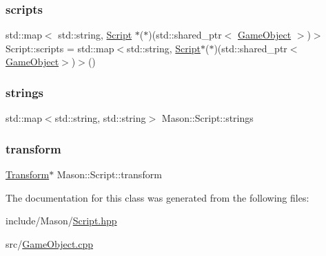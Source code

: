 \subsubsection{\texorpdfstring{scripts}{scripts}}
{\footnotesize\ttfamily std\+::map$<$ std\+::string, \hyperlink{class_mason_1_1_script}{Script} $\ast$($\ast$)(std\+::shared\+\_\+ptr$<$ \hyperlink{class_mason_1_1_game_object}{Game\+Object} $>$)$>$ Script\+::scripts = std\+::map$<$std\+::string, \hyperlink{class_mason_1_1_script}{Script}$\ast$($\ast$)(std\+::shared\+\_\+ptr$<$\hyperlink{class_mason_1_1_game_object}{Game\+Object}$>$)$>$()\hspace{0.3cm}{\ttfamily [static]}}

\hypertarget{class_mason_1_1_script_a96f691d0ccd8db2e3e95824e8579cc42}{}\label{class_mason_1_1_script_a96f691d0ccd8db2e3e95824e8579cc42} 
\subsubsection{\texorpdfstring{strings}{strings}}
{\footnotesize\ttfamily std\+::map$<$std\+::string, std\+::string$>$ Mason\+::\+Script\+::strings}

\hypertarget{class_mason_1_1_script_a4ac6ab2299555435468ba62c52ede167}{}\label{class_mason_1_1_script_a4ac6ab2299555435468ba62c52ede167} 
\subsubsection{\texorpdfstring{transform}{transform}}
{\footnotesize\ttfamily \hyperlink{class_mason_1_1_transform}{Transform}$\ast$ Mason\+::\+Script\+::transform}



The documentation for this class was generated from the following files\+:\begin{DoxyCompactItemize}
\item 
include/\+Mason/\hyperlink{_script_8hpp}{Script.\+hpp}\item 
src/\hyperlink{_game_object_8cpp}{Game\+Object.\+cpp}\end{DoxyCompactItemize}
